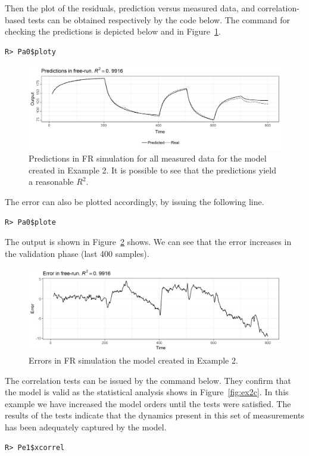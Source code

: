 \documentclass[preprint,12pt, a4paper]{elsarticle}
\begin{document}
Then the plot of the residuals, prediction versus measured data, and correlation-based tests can be obtained respectively by the code below. The command for checking the predictions is depicted below and in Figure~\ref{fig:ex2a}.

\begin{verbatim}
R> Pa0$ploty
\end{verbatim}

\begin{figure}[h!]
	\centering
	\includegraphics[width=15cm,keepaspectratio]{ex2y}
	\caption{Predictions in FR simulation for all measured data for the model created in Example 2. It is possible to see that the predictions yield a reasonable $ R^2 $.} \label{fig:ex2a}
\end{figure}

The error can also be plotted accordingly, by issuing the following line.

\begin{verbatim}
R> Pa0$plote  
\end{verbatim}

The output is shown in Figure~\ref{fig:ex2b} shows. We can see that the error increases in the validation phase (last 400 samples). 

\begin{figure}[h!]
	\centering
	\includegraphics[width=15cm,keepaspectratio]{ex2e}
	\caption{Errors in FR simulation the model created in Example 2.} \label{fig:ex2b}
\end{figure}

The correlation tests can be issued by the command below. They confirm that the model is valid as the statistical analysis shows in Figure~\ref{fig:ex2c}. In this example we have increased the model orders until the tests were satisfied. The results of the tests indicate that the dynamics present in this set of measurements has been adequately captured by the model.
\begin{verbatim}
R> Pe1$xcorrel 	
\end{verbatim}
\end{document}
